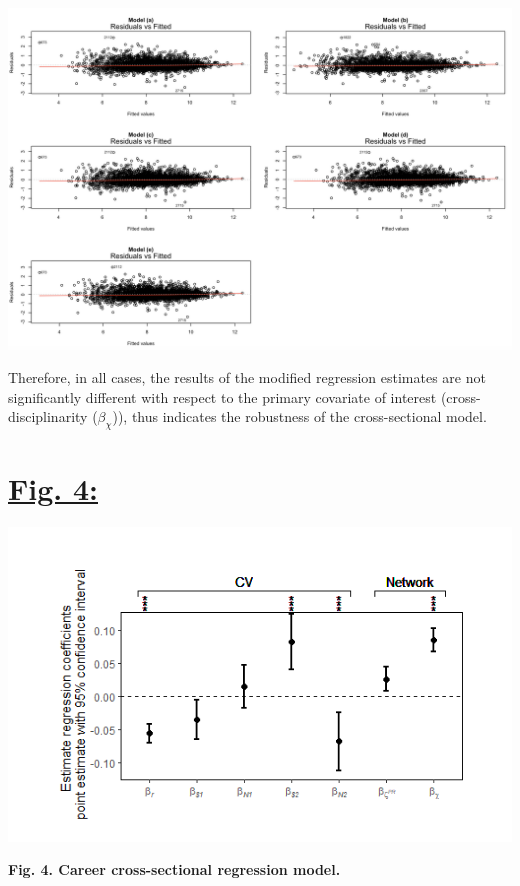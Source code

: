 \documentclass{article}\usepackage[]{graphicx}\usepackage[]{color}
\begin{document}
\begin{description}
    \begin{center}
    \includegraphics[scale=0.33]{ResidualPlots_TableS3.png}
    \end{center}
  \item Therefore, in all cases, the results of the modified regression estimates are not significantly different with respect to the primary covariate of interest (cross-disciplinarity ($\beta_{\chi}$)), thus indicates the robustness of the cross-sectional model.
\end{description}

\newpage
\section*{\underline{Fig. 4:}}
\begin{center}
\includegraphics[scale=1.0]{Fig4.png}
\newline
\par{\textbf{Fig. 4. Career cross-sectional regression model.}}
\end{center}
\end{document}
